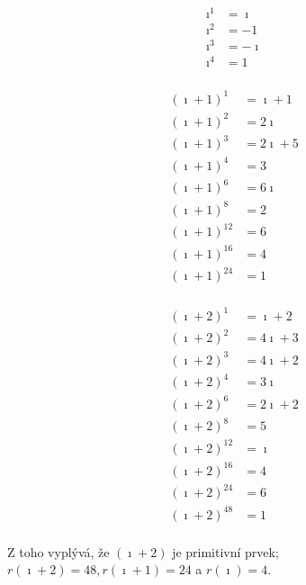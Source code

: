 \documentclass{article}
\begin{document}
\begin{figure}[h]
  \hfill
  \begin{minipage}[t]{.31\textwidth}
    \begin{align*}
			\imath^1 & = \imath\\
			\imath^2 & = -1\\
			\imath^3 & = -\imath\\
			\imath^4 & = 1\\
	  \end{align*}
  \end{minipage}
  \hfill
  \begin{minipage}[t]{.31\textwidth}
    \begin{align*}
		(\imath + 1)^1 		& = \imath + 1\\
		(\imath + 1)^2 		& = 2\imath \\
		(\imath + 1)^3 		& = 2\imath + 5\\
		(\imath + 1)^4 		& = 3\\
		(\imath + 1)^6 		& = 6\imath\\
		(\imath + 1)^8 		& = 2\\
		(\imath + 1)^{12} & = 6\\
		(\imath + 1)^{16} & = 4\\
		(\imath + 1)^{24} & = 1\\
		\end{align*}
  \end{minipage}
  \hfill
  \begin{minipage}[t]{.31\textwidth}
    \begin{align*}
		(\imath + 2)^1 		& = \imath + 2\\
		(\imath + 2)^2 		& = 4\imath + 3 \\
		(\imath + 2)^3 		& = 4\imath + 2\\
		(\imath + 2)^4 		& = 3\imath\\
		(\imath + 2)^6 		& = 2\imath + 2\\
		(\imath + 2)^8 		& = 5\\
		(\imath + 2)^{12} & = \imath\\
		(\imath + 2)^{16} & = 4\\
		(\imath + 2)^{24} & = 6\\
		(\imath + 2)^{48} & = 1\\
		\end{align*}

  \end{minipage}
  \hfill
\end{figure}

Z toho vyplývá, že $(\imath + 2)$ je primitivní prvek; $r(\imath + 2) = 48, r(\imath + 1) = 24$ a $r(\imath) = 4$.
\end{document}
